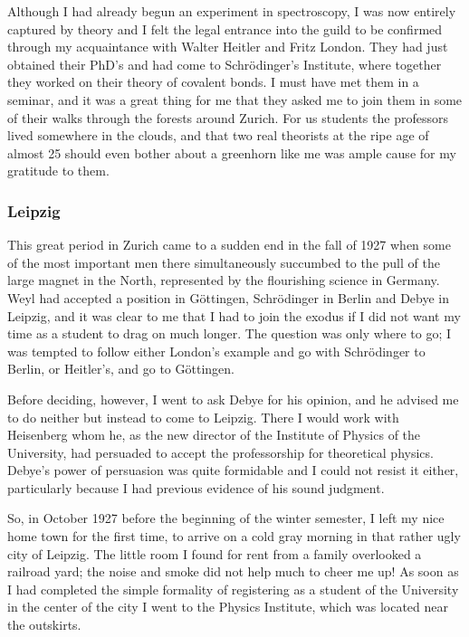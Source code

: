 \documentclass[12pt]{article}
\begin{document}
Although I had already begun an experiment in spectroscopy, I was now entirely captured by theory and I felt the legal entrance into the guild to be confirmed through my acquaintance with Walter Heitler and Fritz London. They had just obtained their PhD's and had come to Schr\"odinger's Institute, where together they worked on their theory of covalent bonds. I must have met them in a seminar, and it was a great thing for me that they asked me to join them in some of their walks through the forests around Zurich. For us students the professors lived somewhere in the clouds, and that two real theorists at the ripe age of almost 25 should even bother about a greenhorn like me was ample cause for my gratitude to them.

\subsubsection*{Leipzig}

This great period in Zurich came to a sudden end in the fall of 1927 when some of the most important men there simultaneously succumbed to the pull of the large magnet in the North, represented by the flourishing science in Germany. Weyl had accepted a position in G\"ottingen, Schr\"odinger in Berlin and Debye in Leipzig, and it was clear to me that I had to join the exodus if I did not want my time as a student to drag on much longer. The question was only where to go; I was tempted to follow either London's example and go with Schr\"odinger to Berlin, or Heitler's, and go to G\"ottingen.

Before deciding, however, I went to ask Debye for his opinion, and he advised me to do neither but instead to come to
Leipzig. There I would work with Heisenberg whom he, as the new director of the Institute of Physics of the University, had persuaded to accept the professorship for theoretical physics. Debye's power of persuasion was quite formidable and I could not resist it either, particularly because I had previous evidence of his sound judgment.

So, in October 1927 before the beginning of the winter semester, I left my nice home town for the first time, to arrive on a cold gray morning in that rather ugly city of Leipzig. The little room I found for rent from a family overlooked a railroad yard; the noise and smoke did not help much to cheer me up! As soon as I had completed the simple formality of registering as a student of the University in the center of the city I went to the Physics Institute, which was located near the outskirts.
\end{document}
